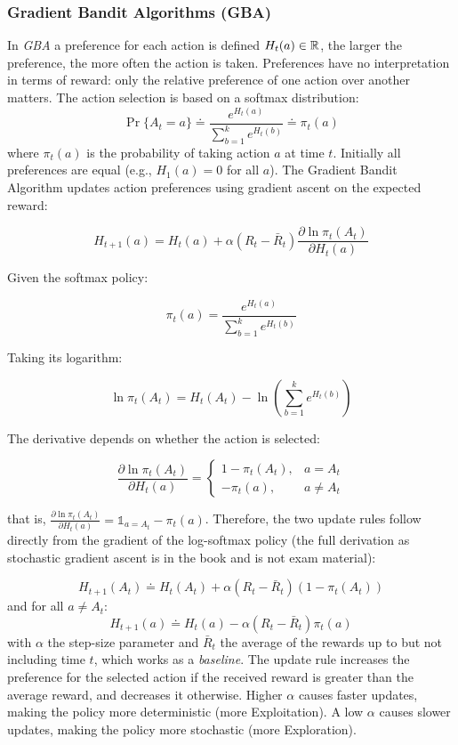 \subsubsection{Gradient Bandit Algorithms (GBA)}
In \textit{GBA} a preference for each action is defined $H_t(a)\in\mathbb{R}$, the larger the preference, the more often the action is taken. Preferences have no interpretation in terms of reward: only the relative preference of one action over another matters. The action selection is based on a softmax distribution:
\[\Pr\{A_t=a\}\doteq\frac{e^{H_t(a)}}{\sum_{b=1}^k e^{H_t(b)}}\doteq\pi_t(a)\]
where $\pi_t(a)$ is the probability of taking action $a$ at time $t$. Initially all preferences are equal (e.g., $H_1(a)=0$ for all $a$).
The Gradient Bandit Algorithm updates action preferences using
gradient ascent on the expected reward:

\[
H_{t+1}(a) = H_t(a) +
\alpha (R_t - \bar{R}_t)
\frac{\partial \ln \pi_t(A_t)}{\partial H_t(a)}
\]

Given the softmax policy:

\[
\pi_t(a) =
\frac{e^{H_t(a)}}{\sum_{b=1}^{k} e^{H_t(b)}}
\]

Taking its logarithm:

\[
\ln \pi_t(A_t)
= H_t(A_t) -
\ln \left( \sum_{b=1}^{k} e^{H_t(b)} \right)
\]

The derivative depends on whether the action is selected:

\[
\frac{\partial \ln \pi_t(A_t)}{\partial H_t(a)}
=
\begin{cases}
1 - \pi_t(A_t), & a = A_t \\[4pt]
-\pi_t(a), & a \neq A_t
\end{cases}
\]

that is, $\frac{\partial \ln \pi_t(A_t)}{\partial H_t(a)}=\mathds{1}_{a=A_t}-\pi_t(a)$. Therefore, the two update rules follow directly from
the gradient of the log-softmax policy (the full derivation as stochastic gradient ascent is in the book and is not exam material):

\[H_{t+1}(A_t)\doteq H_t(A_t)+\alpha(R_t-\bar{R}_t)(1-\pi_t(A_t))\]
and for all $a\ne A_t$:
\[H_{t+1}(a)\doteq H_t(a)-\alpha(R_t-\bar{R}_t)\pi_t(a)\]
with $\alpha$ the step-size parameter and $\bar{R}_t$ the average of the rewards up to but not including time $t$, which works as a \textit{baseline}. The update rule increases the preference for the selected action if the received reward is greater than the average reward, and decreases it otherwise.
Higher $\alpha$ causes faster updates, making the policy more deterministic (more Exploitation). A low $\alpha$ causes slower updates, making the policy more stochastic (more Exploration).

